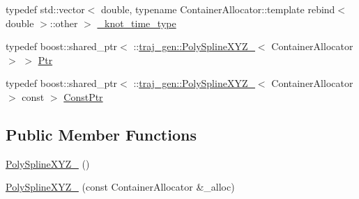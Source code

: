 \begin{DoxyCompactItemize}
typedef std\+::vector$<$ double, typename Container\+Allocator\+::template rebind$<$ double $>$\+::other $>$ \hyperlink{structtraj__gen_1_1_poly_spline_x_y_z___a64249b19835eb126ff0cad0498fa2cf9}{\+\_\+knot\+\_\+time\+\_\+type}
\item 
typedef boost\+::shared\+\_\+ptr$<$ \+::\hyperlink{structtraj__gen_1_1_poly_spline_x_y_z__}{traj\+\_\+gen\+::\+Poly\+Spline\+X\+Y\+Z\+\_\+}$<$ Container\+Allocator $>$ $>$ \hyperlink{structtraj__gen_1_1_poly_spline_x_y_z___a90af1068efc9032c5640f140c5c2cd71}{Ptr}
\item 
typedef boost\+::shared\+\_\+ptr$<$ \+::\hyperlink{structtraj__gen_1_1_poly_spline_x_y_z__}{traj\+\_\+gen\+::\+Poly\+Spline\+X\+Y\+Z\+\_\+}$<$ Container\+Allocator $>$ const  $>$ \hyperlink{structtraj__gen_1_1_poly_spline_x_y_z___abe05b1cea8a30ca9f6f4279e9f0f5da6}{Const\+Ptr}
\end{DoxyCompactItemize}
\subsection*{Public Member Functions}
\begin{DoxyCompactItemize}
\item 
\hyperlink{structtraj__gen_1_1_poly_spline_x_y_z___af8c03b1409edd221b5c5118473f5d617}{Poly\+Spline\+X\+Y\+Z\+\_\+} ()
\item 
\hyperlink{structtraj__gen_1_1_poly_spline_x_y_z___a8ae3b4d4aec5fbeb2fabd1d341951001}{Poly\+Spline\+X\+Y\+Z\+\_\+} (const Container\+Allocator \&\+\_\+alloc)
\end{DoxyCompactItemize}
